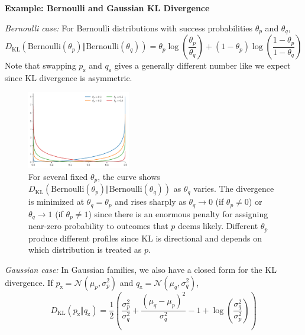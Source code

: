 \begin{exampleBox}
    \textbf{Example: Bernoulli and Gaussian KL Divergence}
    
    \emph{Bernoulli case:} For Bernoulli distributions with success probabilities $\theta_p$ and $\theta_q$,
    \begin{equation}
        D_{\mathrm{KL}}(\mathrm{Bernoulli}(\theta_p)\Vert \mathrm{Bernoulli}(\theta_q))
        =\theta_p\log\!\left(\frac{\theta_p}{\theta_q}\right)+(1-\theta_p)\log\!\left(\frac{1-\theta_p}{1-\theta_q}\right)
    \end{equation}
    Note that swapping $p_{\mathsf{x}}$ and $q_{\mathsf{x}}$ gives a generally different number like we expect since KL divergence is asymmetric. 

    \begin{figure}[H]
        \centering
        \includegraphics[width=0.4\textwidth]{figs/probability/bernoulli_kl_theta.pdf}
        \caption{For several fixed $\theta_p$, the curve shows $D_{\mathrm{KL}}(\mathrm{Bernoulli}(\theta_p)\Vert \mathrm{Bernoulli}(\theta_q))$ as $\theta_q$ varies. The divergence is minimized at $\theta_q=\theta_p$ and rises sharply as $\theta_q\to 0$ (if $\theta_p\neq 0$) or $\theta_q\to 1$ (if $\theta_p \neq 1$) since there is an enormous penalty for assigning near-zero probability to outcomes that $p$ deems likely. Different $\theta_p$ produce different profiles since KL is directional and depends on which distribution is treated as $p$.}
        \label{fig:bernoulli-kl-theta}
    \end{figure}

    \emph{Gaussian case:} In Gaussian families, we also have a closed form for the KL divergence. If $p_{\mathsf{x}}=\mathcal{N}(\mu_p,\sigma_p^2)$ and $q_{\mathsf{x}}=\mathcal{N}(\mu_q,\sigma_q^2)$,
    \begin{equation}
        D_{\mathrm{KL}}(p_{\mathsf{x}}\Vert q_{\mathsf{x}})=\frac{1}{2}\!\left(\frac{\sigma_p^2}{\sigma_q^2}+\frac{(\mu_q-\mu_p)^2}{\sigma_q^2}-1+\log\!\left(\frac{\sigma_q^2}{\sigma_p^2}\right)\right)
    \end{equation}


\end{exampleBox}
